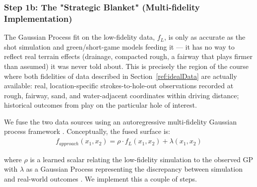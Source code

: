 \documentclass[11pt, letterpaper]{article}
\begin{document}


\subsubsection{Step 1b: The "Strategic Blanket" (Multi-fidelity Implementation)}
\label{subsec: multifid imp}


The Gaussian Process fit on the low-fidelity data, $f_L$, is only as accurate as the shot simulation and green/short-game models feeding it --- it has no way to reflect real terrain effects (drainage, compacted rough, a fairway that plays firmer than assumed) it was
never told about. This is precisely the region of the course where both fidelities of data described in Section~\ref{ref:idealData} are actually available: real, location-specific strokes-to-hole-out observations recorded at rough, fairway, sand, and water-adjacent
coordinates within driving distance; historical outcomes from play on the particular hole of interest.

We fuse the two data sources using an autoregressive multi-fidelity Gaussian process framework \parencite{kennedy2000predicting}. Conceptually, the fused surface is:
\begin{align}
f_{approach}(x_1,x_2) = \rho \cdot f_{L}(x_1,x_2) + \lambda(x_1,x_2)    
\end{align}

where $\rho$ is a learned scalar relating the low-fidelity simulation to the observed GP with $\lambda$ as a Gaussian Process representing the discrepancy between simulation and real-world outcomes \parencite{kennedy2001bayesian}. We implement this a couple of steps.
\end{document}

